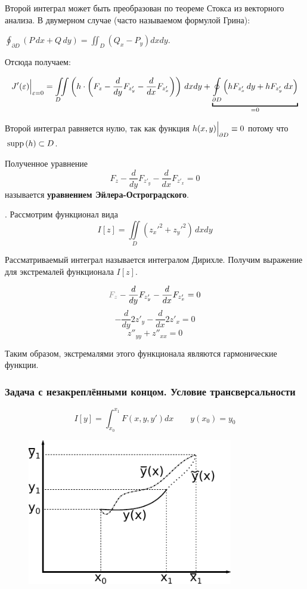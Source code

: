 \documentclass[12pt]{article}
\begin{document}
			Второй интеграл может быть преобразован по теореме Стокса из векторного анализа. В двумерном случае (часто называемом формулой Грина):

			$\oint_{\partial D} (P\,dx + Q\,dy) = \iint_{D} (Q_x - P_y) dx dy$.

			Отсюда получаем:

			$$
				J'(\varepsilon)\lims{\varepsilon = 0}{} = 
				\underset{D\hspace{10pt}}{\iint} \left( h\cdot\left(F_z - \frac{d}{dy}F_{z'_y} - \frac{d}{dx}F_{z'_x}\right) \right) \,dxdy
				+ \underbracket{\underset{\partial D}{\oint} \left(hF_{z'_x}\,dy + hF_{z'_y}\,dx \right)}_{=0}
			$$

			Второй интеграл равняется нулю, так как функция $h(x, y)\Big|_{\partial D}^{} \equiv 0$ потому что $\,\text{supp}\,(h) \subset D$.

			Полученное уравнение
			$$F_z - \frac{d}{dy}F_{z'_y} - \frac{d}{dx}F_{z'_x} = 0$$
			называется \textbf{уравнением Эйлера-Остроградского}.

			. Рассмотрим функционал вида 
				$$I[z] = \iint\limits_D \left(z_x'^2 + z_y'^2\right) \,dxdy$$
	
				Рассматриваемый интеграл называется интегралом Дирихле. Получим выражение для экстремалей
				функционала $I[z]$.
	
				$$\off{F_z} - \frac{d}{dy} F_{z'_y} - \frac{d}{dx} F_{z'_x} = 0$$
				$$-\frac{d}{dy} 2z'_y - \frac{d}{dx} 2z'_x = 0$$
				$$z''_{yy} + z''_{xx} = 0$$
	
				Таким образом, экстремалями этого функционала являются гармонические функции.

		\subsubsection{Задача с незакреплёнными концом. Условие трансверсальности}

			$$I[y] = \int_{x_0}^{x_1} F(x, y, y')dx \qquad y(x_0) = y_0$$
	
			\begin{figure}
				\includegraphics[width=0.8\textwidth]{./../Graphics/Lectures-12-unknowntask.pdf}
			\end{figure}
	
\end{document}

